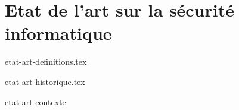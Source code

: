 \part{Etat de l'art sur la sécurité informatique}
\parttoc %

%
{etat-art-definitions.tex}

%
{etat-art-historique.tex}

% 
{etat-art-contexte}